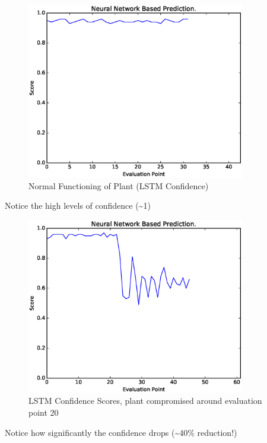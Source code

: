 \documentclass[10pt]{beamer}
\begin{document}
\begin{frame}
  \begin{figure}
    \centering
    \includegraphics[width=0.85\textwidth]{Normal_Functioning_NN.eps}
    \caption{\label{fig:NFN}Normal Functioning of Plant (LSTM Confidence)}
  \end{figure}
  Notice the high levels of confidence (\textasciitilde 1)
\end{frame}

\begin{frame}
  \begin{figure}
    \centering
    \includegraphics[width=0.85\textwidth]{Compromised_Functioning_NN.eps}
    \caption{\label{fig:CFN}LSTM Confidence Scores, plant compromised around evaluation point 20}
  \end{figure}
  Notice how significantly the confidence drops (\textasciitilde 40\% reduction!)
\end{frame}
\end{document}
